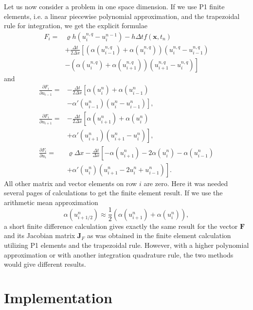 \documentclass[twoside]{article}
\begin{document}
Let us now consider a problem in one space dimension. If we use P1 finite elements, i.e. a linear piecewise polynomial approximation, and the trapezoidal rule for integration, we get the explicit formulae
\begin{align}
  F_{i} =& \varrho h(u_{i}^{n, q} - u_{i}^{n-1}) - h\Delta t f(\mathbf{x}, t_{n}) \nonumber \\
  & + \frac{\Delta t}{2\Delta x}\left[ (\alpha(u_{i-1}^{n, q}) + \alpha(u_{i}^{n, q}))(u_{i}^{n, q} - u_{i-1}^{n, q})\right. \nonumber \\
    & \left. - (\alpha(u_{i}^{n, q}) + \alpha(u_{i+1}^{n, q}))(u_{i+1}^{n, q} - u_{i}^{n, q})\right]
\end{align}
and
\begin{align}
  \frac{\partial F_{i}}{\partial u_{i-1}} =& -\frac{\Delta t}{2\Delta x}\left[ \alpha(u_{i}^{n}) + \alpha(u_{i-1}^{n})\right. \nonumber \\
    & \left. - \alpha'(u_{i-1}^{n})(u_{i}^{n} - u_{i-1}^{n})\right], \nonumber \\
  \frac{\partial F_{i}}{\partial u_{i+1}} =& -\frac{\Delta t}{2\Delta x}\left[ \alpha(u_{i+1}^{n}) + \alpha(u_{i}^{n}) \right. \nonumber \\
    & \left. + \alpha'(u_{i+1}^{n})(u_{i+1}^{n} - u_{i}^{n})\right], \nonumber \\
  \frac{\partial F_{i}}{\partial u_{i}} =& \varrho \Delta x - \frac{\Delta t}{\Delta x}\left[ -\alpha(u_{i+1}^{n}) - 2\alpha(u_{i}^{n}) -\alpha(u_{i-1}^{n}) \right.  \nonumber \\
    & \left. + \alpha'(u_{i}^{n})(u_{i+1}^{n} - 2u_{i}^{n} + u_{i-1}^{n})\right].
\end{align}
All other matrix and vector elements on row $i$ are zero. Here it was needed several pages of calculations to get the finite element result. If we use the arithmetic mean approximation
\begin{equation}
  \alpha(u_{i+1/2}^{n}) \approx \frac{1}{2}(\alpha(u_{i+1}^{n}) + \alpha(u_{i}^{n})),
\end{equation}
a short finite difference calculation gives exactly the same result for the vector $\mathbf{F}$ and its Jacobian matrix $\mathbf{J}_{F}$ as was obtained in the finite element calculation utilizing P1 elements and the trapezoidal rule. However, with a higher polynomial approximation or with another integration quadrature rule, the two methods would give different results.

\section{Implementation}
\end{document}
